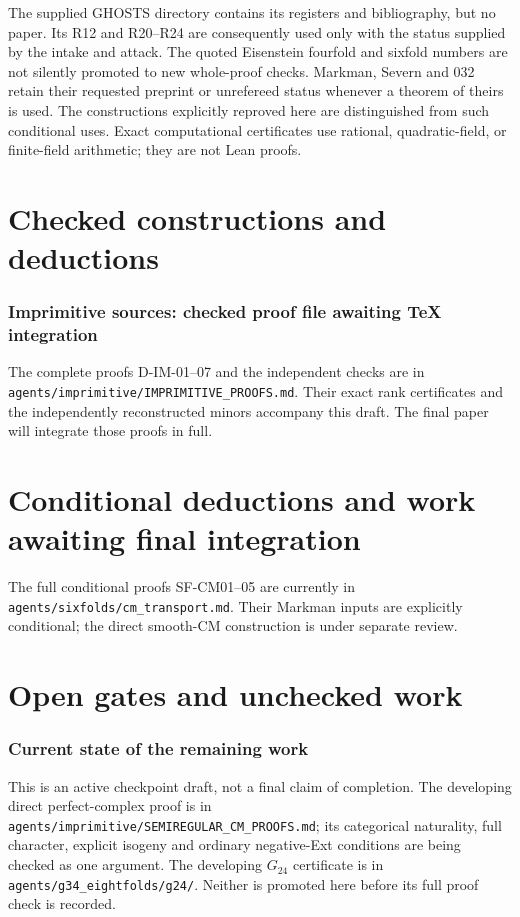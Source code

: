 \documentclass[11pt]{article}
\theoremstyle{remark}\newtheorem{remark}[theorem]{Remark}
\begin{document}
The supplied GHOSTS directory contains its registers and bibliography,
but no paper. Its R12 and R20--R24 are consequently used only with the
status supplied by the intake and attack. The quoted Eisenstein
fourfold and sixfold numbers are not silently promoted to new
whole-proof checks. Markman, Severn and 032 retain their requested
preprint or unrefereed status whenever a theorem of theirs is used.
The constructions explicitly reproved here are distinguished from
such conditional uses. Exact computational certificates use rational,
quadratic-field, or finite-field arithmetic; they are not Lean proofs.

\part{Checked constructions and deductions}




 {}
 {\section{Imprimitive sources: checked proof file awaiting TeX integration}
 The complete proofs D-IM-01--07 and the independent checks are in
 \texttt{agents/imprimitive/IMPRIMITIVE\_PROOFS.md}. Their exact rank
 certificates and the independently reconstructed minors accompany this
 draft. The final paper will integrate those proofs in full.}


\part{Conditional deductions and work awaiting final integration}
 {}
 {The full conditional proofs SF-CM01--05 are currently in
 \texttt{agents/sixfolds/cm\_transport.md}. Their Markman inputs are
 explicitly conditional; the direct smooth-CM construction is under
 separate review.}

\part{Open gates and unchecked work}
\section{Current state of the remaining work}
This is an active checkpoint draft, not a final claim of completion.
The developing direct perfect-complex proof is in
\texttt{agents/imprimitive/SEMIREGULAR\_CM\_PROOFS.md}; its categorical
naturality, full character, explicit isogeny and ordinary negative-Ext
conditions are being checked as one argument. The developing $G_{24}$
certificate is in \texttt{agents/g34\_eightfolds/g24/}. Neither is
promoted here before its full proof check is recorded.
\end{document}
